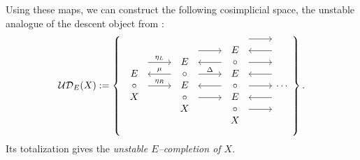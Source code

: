 \begin{definition}
Using these maps, we can construct the following cosimplicial space, the unstable analogue of the descent object from :
\[\sheaf{UD}_E(X) := \left\{
\begin{tikzcd}
\begin{array}{c} E \\ \circ \\ X \end{array} \arrow[leftarrow, shift left=\baselineskip]{r}{\mu} \arrow[shift left=(2*\baselineskip)]{r}{\eta_L} \arrow{r}{\eta_R} &
\begin{array}{c} E \\ \circ \\ E \\ \circ \\ X \end{array} \arrow[shift left=(3*\baselineskip)]{r} \arrow[leftarrow, shift left=(2*\baselineskip)]{r} \arrow[shift left=\baselineskip]{r}{\Delta} \arrow[leftarrow]{r} \arrow[shift right=\baselineskip]{r} &
\begin{array}{c} E \\ \circ \\ E \\ \circ \\ E \\ \circ \\ X \end{array} \arrow[shift left=(4*\baselineskip)]{r} \arrow[leftarrow, shift left=(3*\baselineskip)]{r} \arrow[shift left=(2*\baselineskip)]{r} \arrow[leftarrow, shift left=\baselineskip]{r} \arrow{r} \arrow[leftarrow, shift right=\baselineskip]{r} \arrow[shift right=(2*\baselineskip)]{r} &
\cdots
\end{tikzcd}
\right\}.\]
Its totalization gives the \textit{unstable $E$--completion of $X$}.
\end{definition}

